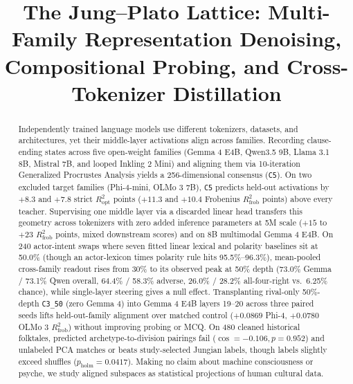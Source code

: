 \documentclass[conference]{IEEEtran}
\begin{document}
\title{The Jung--Plato Lattice: Multi-Family Representation Denoising, Compositional Probing, and Cross-Tokenizer Distillation}

\author{
}

\maketitle

\begin{abstract}
Independently trained language models use different tokenizers, datasets, and architectures, yet their middle-layer activations align across families. Recording clause-ending states across five open-weight families (Gemma 4 E4B, Qwen3.5 9B, Llama 3.1 8B, Mistral 7B, and looped Inkling 2 Mini) and aligning them via 10-iteration Generalized Procrustes Analysis yields a 256-dimensional consensus (\texttt{C5}). On two excluded target families (Phi-4-mini, OLMo 3 7B), \texttt{C5} predicts held-out activations by $+8.3$ and $+7.8$ strict $R^2_{\text{opt}}$ points ($+11.3$ and $+10.4$ Frobenius $R^2_{\text{frob}}$ points) above every teacher. Supervising one middle layer via a discarded linear head transfers this geometry across tokenizers with zero added inference parameters at 5M scale ($+15$ to $+23$ $R^2_{\text{frob}}$ points, mixed downstream scores) and on 8B multimodal Gemma 4 E4B. On 240 actor-intent swaps where seven fitted linear lexical and polarity baselines sit at 50.0\% (though an actor-lexicon times polarity rule hits 95.5\%--96.3\%), mean-pooled cross-family readout rises from 30\% to its observed peak at 50\% depth (73.0\% Gemma / 73.1\% Qwen overall, 64.4\% / 58.3\% adverse, 26.0\% / 28.2\% all-four-right vs.\ 6.25\% chance), while single-layer steering gives a null effect. Transplanting rival-only 50\%-depth \texttt{C3\_50} (zero Gemma 4) into Gemma 4 E4B layers 19--20 across three paired seeds lifts held-out-family alignment over matched control ($+0.0869$ Phi-4, $+0.0780$ OLMo 3 $R^2_{\text{frob}}$) without improving probing or MCQ. On 480 cleaned historical folktales, predicted archetype-to-division pairings fail ($\cos=-0.106, p=0.952$) and unlabeled PCA matches or beats study-selected Jungian labels, though labels slightly exceed shuffles ($p_{\text{holm}}=0.0417$). Making no claim about machine consciousness or psyche, we study aligned subspaces as statistical projections of human cultural data.
\end{abstract}
\end{document}
